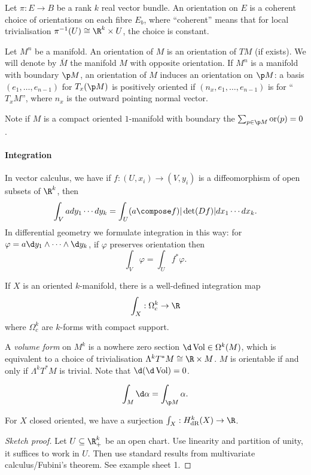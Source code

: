 \documentclass[a4paper]{article}
\newcommand{\w}{\wedge} %
\DeclareMathOperator{\Vol}{Vol} %
\begin{document}
Let \(\pi: E \to B\) be a rank \(k\) real vector bundle. An orientation on \(E\) is a coherent choice of orientations on each fibre \(E_b\), where ``coherent'' means that for local trivialisation \(\pi^{-1}(U) \cong \R^k \times U\), the choice is constant.

Let \(M^n\) be a manifold. An orientation of \(M\) is an orientation of \(TM\) (if exists). We will denote by \(\overline M\) the manifold \(M\) with opposite orientation. If \(M^n\) is a manifold with boundary \(\p M\), an orientation of \(M\) induces an orientation on \(\p M\): a basis \((e_1, \dots, e_{n - 1})\) for \(T_x(\p M)\) is positively oriented if \((n_x, e_1, \dots, e_{n - 1})\) is for ``\(T_xM\)'', where \(n_x\) is the outward pointing normal vector.

Note if \(M\) is a compact oriented \(1\)-manifold with boundary the \(\sum_{p \in \p M} \operatorname{or}(p) = 0\).

\paragraph{Integration}

In vector calculus, we have if \(f: (U, x_i) \to (V, y_i)\) is a diffeomorphism of open subsets of \(\R^k\), then
\[
  \int_V a dy_1 \cdots dy_k = \int_U (a \compose f) |\det(Df)| dx_1 \cdots dx_k.
\]
In differential geometry we formulate integration in this way: for \(\varphi = a \d y_1 \w \cdots \w \d y_k\), if \(\varphi\) preserves orientation then
\[
  \int_V \varphi = \int_U f^* \varphi.
\]

\begin{lemma}
  If \(X\) is an oriented \(k\)-manifold, there is a well-defined integration map
  \[
    \int_X: \Omega^k_c \to \R
  \]
  where \(\Omega^k_c\) are \(k\)-forms with compact support.
\end{lemma}

A \emph{volume form} on \(M^k\) is a nowhere zero section \(\d \Vol \in \Omega^k(M)\), which is equivalent to a choice of trivialisation \(\Lambda^kT^*M \cong \R \times M\). \(M\) is orientable if and only if \(\Lambda^kT^*M\) is trivial. Note that \(\d (\d \Vol) = 0\).

\begin{theorem}[Stokes]
  \[
    \int_M \d \alpha = \int_{\p M} \alpha.
  \]
\end{theorem}

\begin{corollary}
  For \(X\) closed oriented, we have a surjection \(\int_X: H^k_{\text{dR}}(X) \to \R\).
\end{corollary}

\begin{proof}[Sketch proof]
  Let \(U \subseteq \R^k_+\) be an open chart. Use linearity and partition of unity, it suffices to work in \(U\). Then use standard results from multivariate calculus/Fubini's theorem. See example sheet 1.
\end{proof}







\printindex
\end{document}
